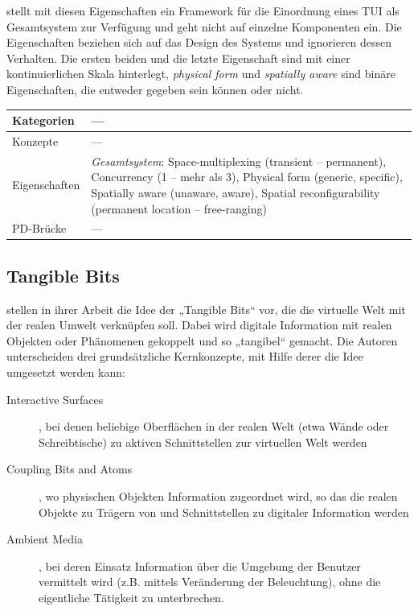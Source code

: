 \citeauthor{Fitzmaurice96} stellt mit diesen Eigenschaften ein Framework für die Einordnung eines \gls{TUI} als Gesamtsystem zur Verfügung und geht nicht auf einzelne Komponenten ein. Die Eigenschaften beziehen sich auf das Design des Systems und ignorieren dessen Verhalten. Die ersten beiden und die letzte Eigenschaft sind mit einer kontinuierlichen Skala hinterlegt, \emph{physical form} und \emph{spatially aware} sind binäre Eigenschaften, die entweder gegeben sein können oder nicht.
\\[1em]
\begin{tabular}{| p{3cm} | p{10cm} |}
  \hline
  Kategorien & --- \\ \hline
  Konzepte & --- \\ \hline
  Eigenschaften & \emph{Gesamtsystem}: Space-multiplexing (transient -- permanent), Concurrency (1 -- mehr als 3), Physical form (generic, specific), Spatially aware (unaware, aware), Spatial reconfigurability (permanent location -- free-ranging) \\ \hline
  PD-Brücke & --- \\ \hline
\end{tabular} 


\subsection{Tangible Bits} %
\label{sub:tangible_bits}

\citet{Ishii97} stellen in ihrer Arbeit die Idee der „Tangible Bits“ vor, die die virtuelle Welt mit der realen Umwelt verknüpfen soll. Dabei wird digitale Information mit realen Objekten oder Phänomenen gekoppelt und so „tangibel“ gemacht. Die Autoren unterscheiden drei grundsätzliche Kernkonzepte, mit Hilfe derer die Idee umgesetzt werden kann:
\begin{description}
	\item[Interactive Surfaces], bei denen beliebige Oberflächen in der realen Welt (etwa Wände oder Schreibtische) zu aktiven Schnittstellen zur virtuellen Welt werden
	\item[Coupling Bits and Atoms], wo physischen Objekten Information zugeordnet wird, so das die realen Objekte zu Trägern von und Schnittstellen zu digitaler Information werden
	\item[Ambient Media], bei deren Einsatz Information über die Umgebung der Benutzer vermittelt wird (z.B. mittels Veränderung der Beleuchtung), ohne die eigentliche Tätigkeit zu unterbrechen. 
\end{description}

